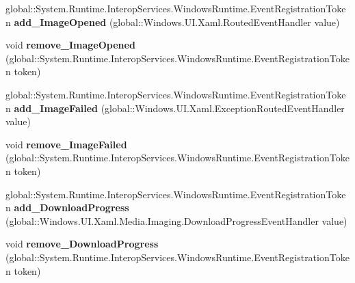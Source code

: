 \begin{DoxyCompactItemize}
global\+::\+System.\+Runtime.\+Interop\+Services.\+Windows\+Runtime.\+Event\+Registration\+Token {\bfseries add\+\_\+\+Image\+Opened} (global\+::\+Windows.\+U\+I.\+Xaml.\+Routed\+Event\+Handler value)
\item 
\mbox{\label{interface_windows_1_1_u_i_1_1_xaml_1_1_media_1_1_imaging_1_1_i_bitmap_image_ac903f9457bc42510bd952dcb07c5c1d1}} 
void {\bfseries remove\+\_\+\+Image\+Opened} (global\+::\+System.\+Runtime.\+Interop\+Services.\+Windows\+Runtime.\+Event\+Registration\+Token token)
\item 
\mbox{\label{interface_windows_1_1_u_i_1_1_xaml_1_1_media_1_1_imaging_1_1_i_bitmap_image_a6aa4435d5ae45040075c92c78e19dabb}} 
global\+::\+System.\+Runtime.\+Interop\+Services.\+Windows\+Runtime.\+Event\+Registration\+Token {\bfseries add\+\_\+\+Image\+Failed} (global\+::\+Windows.\+U\+I.\+Xaml.\+Exception\+Routed\+Event\+Handler value)
\item 
\mbox{\label{interface_windows_1_1_u_i_1_1_xaml_1_1_media_1_1_imaging_1_1_i_bitmap_image_ab77fcc8961126a071f77bee1dc55bcc6}} 
void {\bfseries remove\+\_\+\+Image\+Failed} (global\+::\+System.\+Runtime.\+Interop\+Services.\+Windows\+Runtime.\+Event\+Registration\+Token token)
\item 
\mbox{\label{interface_windows_1_1_u_i_1_1_xaml_1_1_media_1_1_imaging_1_1_i_bitmap_image_a81353ece4edf0af8840923994b02b772}} 
global\+::\+System.\+Runtime.\+Interop\+Services.\+Windows\+Runtime.\+Event\+Registration\+Token {\bfseries add\+\_\+\+Download\+Progress} (global\+::\+Windows.\+U\+I.\+Xaml.\+Media.\+Imaging.\+Download\+Progress\+Event\+Handler value)
\item 
\mbox{\label{interface_windows_1_1_u_i_1_1_xaml_1_1_media_1_1_imaging_1_1_i_bitmap_image_ab600f3019a91621d8000a9cdc22141e7}} 
void {\bfseries remove\+\_\+\+Download\+Progress} (global\+::\+System.\+Runtime.\+Interop\+Services.\+Windows\+Runtime.\+Event\+Registration\+Token token)
\item 

\end{DoxyCompactItemize}
